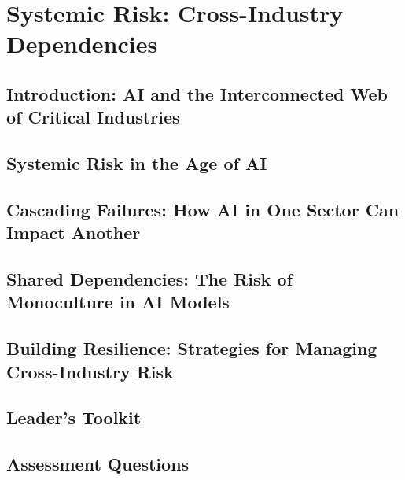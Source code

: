 \chapter{Systemic Risk: Cross-Industry Dependencies}
\label{chap:systemic_risk}

\section{Introduction: AI and the Interconnected Web of Critical Industries}
\label{sec:systemic_risk_introduction}

\section{Systemic Risk in the Age of AI}
\label{sec:systemic_risk_in_ai_age}

\section{Cascading Failures: How AI in One Sector Can Impact Another}
\label{sec:cascading_failures}

\section{Shared Dependencies: The Risk of Monoculture in AI Models}
\label{sec:shared_dependencies}

\section{Building Resilience: Strategies for Managing Cross-Industry Risk}
\label{sec:building_resilience}

\section{Leader's Toolkit}
\label{sec:systemic_risk_leaders_toolkit}

\section{Assessment Questions}
\label{sec:systemic_risk_assessment_questions}